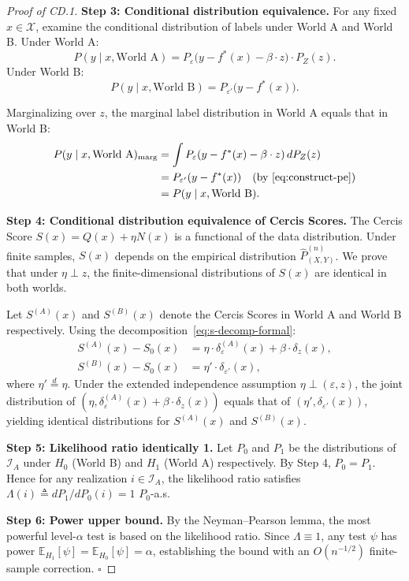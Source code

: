 \documentclass[12pt,a4paper]{article}
\newcommand{\E}{\mathbb{E}}
\newcommand{\cX}{\mathcal{X}}
\newcommand{\cI}{\mathcal{I}}
\newcommand{\indist}{\stackrel{d}{=}}
\newcommand{\defeq}{\triangleq}
\begin{document}
\begin{proof}[Proof of CD.1]
\textbf{Step 3: Conditional distribution equivalence.}
For any fixed $x \in \cX$, examine the conditional distribution of labels under World A and World B.
Under World A:
\begin{equation}
    P(y \mid x, \text{World A}) = P_\varepsilon\big(y - f^*(x) - \beta\cdot z\big) \cdot P_Z(z).
\end{equation}
Under World B:
\begin{equation}
    P(y \mid x, \text{World B}) = P_{\varepsilon'}\big(y - f^*(x)\big).
\end{equation}

Marginalizing over $z$, the marginal label distribution in World A equals that in World B:
\begin{align}
    P(y \mid x, \text{World A})_{\text{marg}}
    &= \int P_\varepsilon(y - f^*(x) - \beta\cdot z)\, dP_Z(z) \notag\\
    &= P_{\varepsilon'}(y - f^*(x)) \quad\text{(by~\eqref{eq:construct-pe})} \notag\\
    &= P(y \mid x, \text{World B}). \label{eq:marginal-equality}
\end{align}

\textbf{Step 4: Conditional distribution equivalence of Cercis Scores.}
The Cercis Score $S(x) = Q(x) + \eta N(x)$ is a functional of the data distribution. Under finite samples, $S(x)$ depends on the empirical distribution $\hat{P}_{(X,Y)}^{(n)}$. We prove that under $\eta \perp z$, the finite-dimensional distributions of $S(x)$ are identical in both worlds.

Let $S^{(A)}(x)$ and $S^{(B)}(x)$ denote the Cercis Scores in World A and World B respectively.
Using the decomposition~\eqref{eq:s-decomp-formal}:
\begin{align}
    S^{(A)}(x) - S_0(x) &= \eta \cdot \delta_\varepsilon^{(A)}(x) + \beta \cdot \delta_z(x), \\
    S^{(B)}(x) - S_0(x) &= \eta' \cdot \delta_{\varepsilon'}(x),
\end{align}
where $\eta' \indist \eta$. Under the extended independence assumption $\eta \perp (\varepsilon, z)$, the joint distribution of $(\eta, \delta_\varepsilon^{(A)}(x) + \beta\cdot\delta_z(x))$ equals that of $(\eta', \delta_{\varepsilon'}(x))$, yielding identical distributions for $S^{(A)}(x)$ and $S^{(B)}(x)$.

\textbf{Step 5: Likelihood ratio identically 1.}
Let $P_0$ and $P_1$ be the distributions of $\cI_A$ under $H_0$ (World B) and $H_1$ (World A) respectively. By Step 4, $P_0 = P_1$. Hence for any realization $i \in \cI_A$, the likelihood ratio satisfies $\Lambda(i) \defeq dP_1/dP_0(i) = 1$ $P_0$-a.s.

\textbf{Step 6: Power upper bound.}
By the Neyman--Pearson lemma, the most powerful level-$\alpha$ test is based on the likelihood ratio. Since $\Lambda \equiv 1$, any test $\psi$ has power $\E_{H_1}[\psi] = \E_{H_0}[\psi] = \alpha$, establishing the bound with an $O(n^{-1/2})$ finite-sample correction. $\square$
\end{proof}
\end{document}
